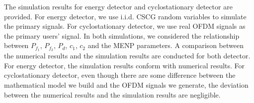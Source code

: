 The simulation results for energy detector and cyclostationary detector are provided. 
For energy detector, we use i.i.d. CSCG random variables to simulate the primary signals. For cyclostationary detector, we use real OFDM signals as the primary users' signal.  
In both simulations, we considered the relationship between $P_{f_1}$, $P_{f_2}$, $P_d$, $c_1$, $c_2$ and the MENP parameters.  A comparison between the numerical results and the simulation results are conducted for both detector.
For energy detector, the simulation results conform with numerical results. For cyclostationary detector, even though there are some difference between the mathematical model we build and the OFDM signals we generate, the deviation between the numerical results and the simulation results are negligible.  
